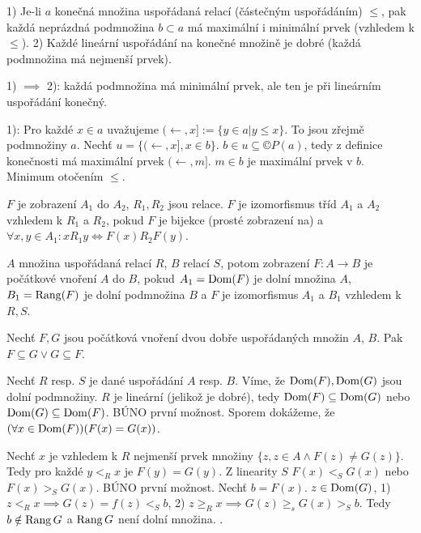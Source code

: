 \documentclass[12pt]{article}                   %
\begin{document}
    \begin{veta}
        1) Je-li $a$ konečná množina uspořádaná relací (částečným uspořádáním) $≤$, pak každá neprázdná podmnožina $b \subset a$ má maximální i minimální prvek (vzhledem k $≤$).
        2) Každé lineární uspořádání na konečné množině je dobré (každá podmnožina má nejmenší prvek).

        \begin{dukazin}
            1) $\implies$ 2): každá podmnožina má minimální prvek, ale ten je při lineárním uspořádání konečný.

            1): Pro každé $x \in a$ uvažujeme $(\leftarrow, x] := \{y \in a | y ≤ x\}$. To jsou zřejmě podmnožiny $a$. Nechť $u = \{(\leftarrow, x], x \in b\}$. $b \in u \subseteq ©P(a)$, tedy z definice konečnosti má maximální prvek $(\leftarrow, m]$. $m \in b$ je maximální prvek v $b$. Minimum otočením $≤$.
        \end{dukazin}
    \end{veta}

    \begin{definice}[Izomorfismus]
        $F$ je zobrazení $A_1$ do $A_2$, $R_1, R_2$ jsou relace. $F$ je izomorfismus tříd $A_1$ a $A_2$ vzhledem k $R_1$ a $R_2$, pokud $F$ je bijekce (prosté zobrazení na) a $\forall x, y \in A_1: xR_1y \Leftrightarrow F(x)R_2F(y)$.
    \end{definice}

    \begin{definice}
        $A$ množina uspořádaná relací $R$, $B$ relací $S$, potom zobrazení $F: A \rightarrow B$ je počátkové vnoření $A$ do $B$, pokud $A_1 = \operatorname{Dom}(F)$ je dolní množina $A$, $B_1 = \operatorname{Rang}(F)$ je dolní podmnožina $B$ a $F$ je izomorfismus $A_1$ a $B_1$ vzhledem k $R, S$.
    \end{definice}

    \begin{lemma}
        Nechť $F, G$ jsou počátková vnoření dvou dobře uspořádaných množin $A$, $B$. Pak $F \subseteq G \lor G \subseteq F$.

        \begin{dukazin}
            Nechť $R$ resp. $S$ je dané uspořádání $A$ resp. $B$. Víme, že $\operatorname{Dom}(F), \operatorname{Dom}(G)$ jsou dolní podmnožiny. $R$ je lineární (jelikož je dobré), tedy $\operatorname{Dom}(F) \subseteq \operatorname{Dom}(G)$ nebo $\operatorname{Dom}(G)\subseteq \operatorname{Dom}(F)$. BÚNO první možnost. Sporem dokážeme, že $(\forall x \in \operatorname{Dom}(F))(F(x) = G(x))$.

            Nechť $x$ je vzhledem k $R$ nejmenší prvek množiny $\{z, z\in A \land F(z)≠G(z)\}$. Tedy pro každé $y <_R x$ je $F(y) = G(y)$. Z linearity $S$ $F(x) <_S G(x)$ nebo $F(x) >_S G(x)$. BÚNO první možnost. Nechť $b = F(x)$. $z \in \operatorname{Dom}(G)$, 1) $z <_R x \implies G(z) = f(z) <_S b$, 2) $z ≥_R x \implies G(z) ≥_s G(x) >_S b$. Tedy $b \notin \operatorname{Rang} G$ a $\operatorname{Rang} G$ není dolní množina. \lightning.
        \end{dukazin}
    \end{lemma}
\end{document}
